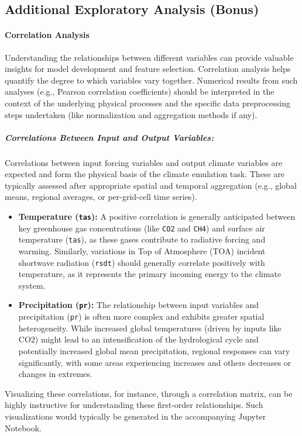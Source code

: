 \documentclass{article}
\begin{document}
\subsection{Additional Exploratory Analysis (Bonus)}

\paragraph{Correlation Analysis}
Understanding the relationships between different variables can provide valuable insights for model development and feature selection. Correlation analysis helps quantify the degree to which variables vary together. Numerical results from such analyses (e.g., Pearson correlation coefficients) should be interpreted in the context of the underlying physical processes and the specific data preprocessing steps undertaken (like normalization and aggregation methods if any).

\subparagraph{Correlations Between Input and Output Variables:}
Correlations between input forcing variables and output climate variables are expected and form the physical basis of the climate emulation task. These are typically assessed after appropriate spatial and temporal aggregation (e.g., global means, regional averages, or per-grid-cell time series).
\begin{itemize}
    \item \textbf{Temperature (\texttt{tas}):} A positive correlation is generally anticipated between key greenhouse gas concentrations (like \texttt{CO2} and \texttt{CH4}) and surface air temperature (\texttt{tas}), as these gases contribute to radiative forcing and warming. Similarly, variations in Top of Atmosphere (TOA) incident shortwave radiation (\texttt{rsdt}) should generally correlate positively with temperature, as it represents the primary incoming energy to the climate system.

    \item \textbf{Precipitation (\texttt{pr}):} The relationship between input variables and precipitation (\texttt{pr}) is often more complex and exhibits greater spatial heterogeneity. While increased global temperatures (driven by inputs like CO2) might lead to an intensification of the hydrological cycle and potentially increased global mean precipitation, regional responses can vary significantly, with some areas experiencing increases and others decreases or changes in extremes.
\end{itemize}
Visualizing these correlations, for instance, through a correlation matrix, can be highly instructive for understanding these first-order relationships. Such visualizations would typically be generated in the accompanying Jupyter Notebook.
\end{document}
